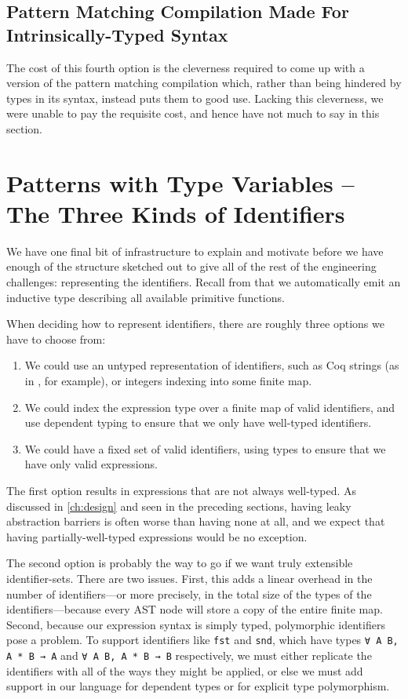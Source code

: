 \subsection{Pattern Matching Compilation Made For Intrinsically-Typed Syntax}\label{sec:rewriting-more:AST:better-pattern-matching}
The cost of this fourth option is the cleverness required to come up with a version of the pattern matching compilation which, rather than being hindered by types in its syntax, instead puts them to good use.
Lacking this cleverness, we were unable to pay the requisite cost, and hence have not much to say in this section.

\section{Patterns with Type Variables -- The Three Kinds of Identifiers}\label{sec:rewriting-more:three-identifier-inductives}
We have one final bit of infrastructure to explain and motivate before we have enough of the structure sketched out to give all of the rest of the engineering challenges: representing the identifiers.
Recall from  that we automatically emit an inductive type describing all available primitive functions.

When deciding how to represent identifiers, there are roughly three options we have to choose from:
\begin{enumerate}
\item
  We could use an untyped representation of identifiers, such as Coq strings (as in \textcite{TemplateCoq}, for example), or integers indexing into some finite map.
\item
  We could index the expression type over a finite map of valid identifiers, and use dependent typing to ensure that we only have well-typed identifiers.
\item
  We could have a fixed set of valid identifiers, using types to ensure that we have only valid expressions.
\end{enumerate}

The first option results in expressions that are not always well-typed.
As discussed in \autoref{ch:design} and seen in the preceding sections, having leaky abstraction barriers is often worse than having none at all, and we expect that having partially-well-typed expressions would be no exception.

The second option is probably the way to go if we want truly extensible identifier-sets.
There are two issues.
First, this adds a linear overhead in the number of identifiers---or more precisely, in the total size of the types of the identifiers---because every AST node will store a copy of the entire finite map.
Second, because our expression syntax is simply typed, polymorphic identifiers pose a problem.
To support identifiers like \texttt{fst} and \texttt{snd}, which have types \texttt{∀ A B, A * B → A} and \texttt{∀ A B, A * B → B} respectively, we must either replicate the identifiers with all of the ways they might be applied, or else we must add support in our language for dependent types or for explicit type polymorphism.

